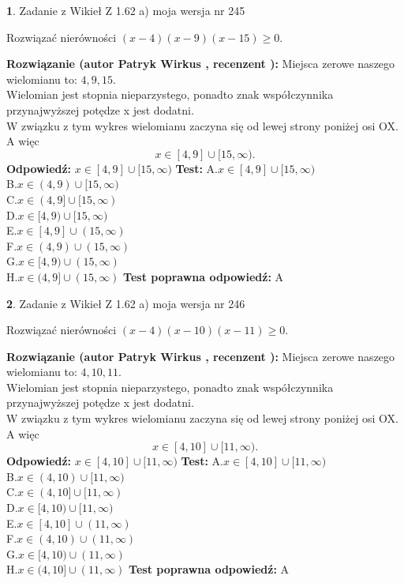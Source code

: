 \documentclass[12pt, a4paper]{article}
\theoremstyle{definition} %
\newtheorem{zad}{}
\newcommand{\zadStart}[1]{\begin{zad}#1\newline}
\newcommand{\zadStop}{\end{zad}}
\newcommand{\rozwStart}[2]{\noindent \textbf{Rozwiązanie (autor #1 , recenzent #2): }\newline}
\newcommand{\rozwStop}{\newline}
\newcommand{\odpStart}{\noindent \textbf{Odpowiedź:}\newline}
\newcommand{\odpStop}{\newline}
\newcommand{\testStart}{\noindent \textbf{Test:}\newline}
\newcommand{\testStop}{\newline}
\newcommand{\kluczStart}{\noindent \textbf{Test poprawna odpowiedź:}\newline}
\newcommand{\kluczStop}{\newline}
\begin{document}
\zadStart{Zadanie z Wikieł Z 1.62 a) moja wersja nr 245}

Rozwiązać nierówności $(x-4)(x-9)(x-15)\ge0$.
\zadStop
\rozwStart{Patryk Wirkus}{}
Miejsca zerowe naszego wielomianu to: $4, 9, 15$.\\
Wielomian jest stopnia nieparzystego, ponadto znak współczynnika przy\linebreak najwyższej potędze x jest dodatni.\\ W związku z tym wykres wielomianu zaczyna się od lewej strony poniżej osi OX. A więc $$x \in [4,9] \cup [15,\infty).$$
\rozwStop
\odpStart
$x \in [4,9] \cup [15,\infty)$
\odpStop
\testStart
A.$x \in [4,9] \cup [15,\infty)$\\
B.$x \in (4,9) \cup [15,\infty)$\\
C.$x \in (4,9] \cup [15,\infty)$\\
D.$x \in [4,9) \cup [15,\infty)$\\
E.$x \in [4,9] \cup (15,\infty)$\\
F.$x \in (4,9) \cup (15,\infty)$\\
G.$x \in [4,9) \cup (15,\infty)$\\
H.$x \in (4,9] \cup (15,\infty)$
\testStop
\kluczStart
A
\kluczStop



\zadStart{Zadanie z Wikieł Z 1.62 a) moja wersja nr 246}

Rozwiązać nierówności $(x-4)(x-10)(x-11)\ge0$.
\zadStop
\rozwStart{Patryk Wirkus}{}
Miejsca zerowe naszego wielomianu to: $4, 10, 11$.\\
Wielomian jest stopnia nieparzystego, ponadto znak współczynnika przy\linebreak najwyższej potędze x jest dodatni.\\ W związku z tym wykres wielomianu zaczyna się od lewej strony poniżej osi OX. A więc $$x \in [4,10] \cup [11,\infty).$$
\rozwStop
\odpStart
$x \in [4,10] \cup [11,\infty)$
\odpStop
\testStart
A.$x \in [4,10] \cup [11,\infty)$\\
B.$x \in (4,10) \cup [11,\infty)$\\
C.$x \in (4,10] \cup [11,\infty)$\\
D.$x \in [4,10) \cup [11,\infty)$\\
E.$x \in [4,10] \cup (11,\infty)$\\
F.$x \in (4,10) \cup (11,\infty)$\\
G.$x \in [4,10) \cup (11,\infty)$\\
H.$x \in (4,10] \cup (11,\infty)$
\testStop
\kluczStart
A
\kluczStop
\end{document}
